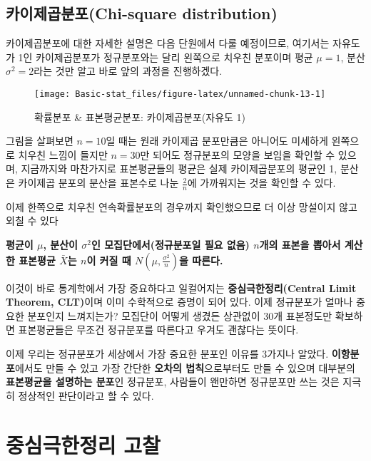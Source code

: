 \documentclass[]{book}
\begin{document}
\hypertarget{uxce74uxc774uxc81cuxacf1uxbd84uxd3ecchi-square-distribution}{%
\subsection{카이제곱분포(Chi-square distribution)}\label{uxce74uxc774uxc81cuxacf1uxbd84uxd3ecchi-square-distribution}}

카이제곱분포에 대한 자세한 설명은 다음 단원에서 다룰 예정이므로, 여기서는 자유도가 1인 카이제곱분포가 정규분포와는 달리 왼쪽으로 치우친 분포이며 평균 \(\mu=1\), 분산 \(\sigma^2=2\)라는 것만 알고 바로 앞의 과정을 진행하겠다.

\begin{figure}

{\centering \texttt{[image: Basic-stat\_files/figure-latex/unnamed-chunk-13-1]} 

}

\caption{확률분포 & 표본평균분포: 카이제곱분포(자유도 1)}\label{fig:unnamed-chunk-13}
\end{figure}

그림을 살펴보면 \(n=10\)일 때는 원래 카이제곱 분포만큼은 아니어도 미세하게 왼쪽으로 치우친 느낌이 들지만 \(n=30\)만 되어도 정규분포의 모양을 보임을 확인할 수 있으며, 지금까지와 마찬가지로 표본평균들의 평균은 실제 카이제곱분포의 평균인 1, 분산은 카이제곱 분포의 분산을 표본수로 나눈 \(\frac{2}{n}\)에 가까워지는 것을 확인할 수 있다.

이제 한쪽으로 치우친 연속확률분포의 경우까지 확인했으므로 더 이상 망설이지 않고 외칠 수 있다

\textbf{평균이 \(\mu\), 분산이 \(\sigma^2\)인 모집단에서(정규분포일 필요 없음) \(n\)개의 표본을 뽑아서 계산한 표본평균 \(\bar{X}\)는 \(n\)이 커질 때 \(N(\mu,\frac{\sigma^2}{n})\)을 따른다.}

이것이 바로 통계학에서 가장 중요하다고 일컬어지는 \textbf{중심극한정리(Central Limit Theorem, CLT)}이며 이미 수학적으로 증명이 되어 있다. 이제 정규분포가 얼마나 중요한 분포인지 느껴지는가? 모집단이 어떻게 생겼든 상관없이 30개 표본정도만 확보하면 표본평균들은 무조건 정규분포를 따른다고 우겨도 괜찮다는 뜻이다.

이제 우리는 정규분포가 세상에서 가장 중요한 분포인 이유를 3가지나 알았다. \textbf{이항분포}에서도 만들 수 있고 가장 간단한 \textbf{오차의 법칙}으로부터도 만들 수 있으며 대부분의 \textbf{표본평균을 설명하는 분포}인 정규분포, 사람들이 왠만하면 정규분포만 쓰는 것은 지극히 정상적인 판단이라고 할 수 있다.

\hypertarget{uxc911uxc2ecuxadf9uxd55cuxc815uxb9ac-uxace0uxcc30}{%
\section{중심극한정리 고찰}\label{uxc911uxc2ecuxadf9uxd55cuxc815uxb9ac-uxace0uxcc30}}
\end{document}
